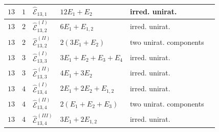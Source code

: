 \documentclass[11pt]{amsart}
\theoremstyle{definition}
\def\E{{\mathcal E}}
\begin{document}
\begin{minipage}[t]{\textwidth/2-1mm}
{\begin{tabular}{ |l | l |l|l|l|l|}
$13$ & $1$ & $\widehat{\E}_{13,1}$ & $12E_1+E_2$ & irred. unirat. \\\hline
$13$ & $2$ & $\widehat{\E}_{13,2}^{(I)}$ & $6E_1+E_{1,2}$ & irred. unirat. \\
$13$ & $2$ & $\widehat{\E}_{13,2}^{(II)}$ & $2(3E_1+E_2)$ & two  unirat. components \\  \hline 
$13$ & $3$ & $\widehat{\E}_{13,3}^{(I)}$ & $3E_1+E_2+E_3+E_4$ & irred. unirat.  \\
$13$ & $3$ & $\widehat{\E}_{13,3}^{(II)}$ & $4E_1+3E_2$  & irred. unirat. \\ \hline 
$13$ & $4$ & $\widehat{\E}_{13,4}^{(I)}$ & $2E_1+2E_2+E_{1,2}$ & irred. unirat. \\
$13$ & $4$ & $\widehat{\E}_{13,4}^{(II)}$ & $2(E_1+E_2+E_3)$ & two  unirat. components \\
$13$ & $4$ & $\widehat{\E}_{13,4}^{(III)}$ &  $3E_1+2E_{1,2}$ & irred. unirat. \\\hline
\end{tabular}    
}
\end{minipage}
%
%
%
%
\hfill
\end{document}
